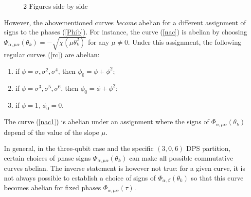 \documentclass{article}
\begin{document}
\begin{figure}[ht]%
    \centering
    \qquad
    \caption{2 Figures side by side}%
    \label{fig1}%
\end{figure}

However, the abovementioned curves \textit{become} abelian for a different
assignment of signs to the phases (\ref{Phib}). For instance, the curve
(\ref{nac}) is abelian by choosing $\Phi_{\alpha,\mu \alpha }(\theta_{k}) =
-\sqrt{\chi\left(\mu \theta_{k}^{2}\right)}$ for any $\mu \neq 0$. Under this
assignment, the following regular curves (\ref{rc}) are abelian:
\begin{enumerate}
  \item if $\phi = \sigma, \sigma^{2}, \sigma^{4}$, then $\phi_{0} = \phi +
    \phi^{2}$;
  \item if $\phi = \sigma^{3}, \sigma^{5}, \sigma^{6}$, then $\phi_{0} = \phi +
    \phi^{2}$;
  \item if $\phi = 1$, $\phi_{0} = 0$.
\end{enumerate}
The curve (\ref{nac1}) is abelian under an assignment where the signs of
$\Phi_{\alpha,\mu \alpha}(\theta_{k})$ depend of the value of the slope $\mu$.

In general, in the three-qubit case and the specific $(3,0,6)$ DPS partition,
certain choices of phase signs $\Phi_{\alpha,\mu \alpha}(\theta_{k})$ can make
all possible commutative curves abelian. The inverse statement is however not
true: for a given curve, it is not always possible to establish a choice of
signs of $\Phi_{\alpha,\beta }(\theta_{k})$ so that this curve becomes abelian
for fixed phases $\Phi_{\alpha,\mu \alpha}(\tau)$.
\end{document}
